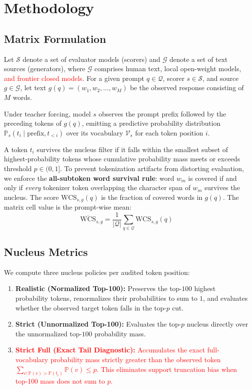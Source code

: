 \documentclass[11pt,a4paper,twocolumn]{article}
\newcommand{\diff}[1]{\textcolor{red}{#1}}
\begin{document}
\section{Methodology}

\subsection{Matrix Formulation}
Let $\mathcal{S}$ denote a set of evaluator models (scorers) and $\mathcal{G}$ denote a set of text sources (generators), where $\mathcal{G}$ comprises human text, local open-weight models, \diff{and frontier closed models}. For a given prompt $q \in \mathcal{Q}$, scorer $s \in \mathcal{S}$, and source $g \in \mathcal{G}$, let text $g(q) = (w_1, w_2, \dots, w_M)$ be the observed response consisting of $M$ words. 

Under teacher forcing, model $s$ observes the prompt prefix followed by the preceding tokens of $g(q)$, emitting a predictive probability distribution $\mathbb{P}_s(t_i \mid \text{prefix}, t_{<i})$ over its vocabulary $\mathcal{V}_s$ for each token position $i$.

A token $t_i$ survives the nucleus filter if it falls within the smallest subset of highest-probability tokens whose cumulative probability mass meets or exceeds threshold $p \in (0, 1]$. To prevent tokenization artifacts from distorting evaluation, we enforce the \textbf{all-subtoken word survival rule}: word $w_m$ is covered if and only if \emph{every} tokenizer token overlapping the character span of $w_m$ survives the nucleus. The score $\text{WCS}_{s,g}(q)$ is the fraction of covered words in $g(q)$. The matrix cell value is the prompt-wise mean:
\begin{equation}
\overline{\text{WCS}}_{s,g} = \frac{1}{|\mathcal{Q}|} \sum_{q \in \mathcal{Q}} \text{WCS}_{s,g}(q)
\end{equation}

\subsection{Nucleus Metrics}
We compute three nucleus policies per audited token position:
\begin{enumerate}
    \item \textbf{Realistic (Normalized Top-100):} Preserves the top-$100$ highest probability tokens, renormalizes their probabilities to sum to $1$, and evaluates whether the observed target token falls in the top-$p$ cut.
    \item \textbf{Strict (Unnormalized Top-100):} Evaluates the top-$p$ nucleus directly over the unnormalized top-$100$ probability mass.
    \item \diff{\textbf{Strict Full (Exact Tail Diagnostic):} Accumulates the exact full-vocabulary probability mass strictly greater than the observed token $\sum_{v: \mathbb{P}(v) > \mathbb{P}(t_i)} \mathbb{P}(v) \le p$. This eliminates support truncation bias when top-100 mass does not sum to $p$.}
\end{enumerate}
\end{document}

